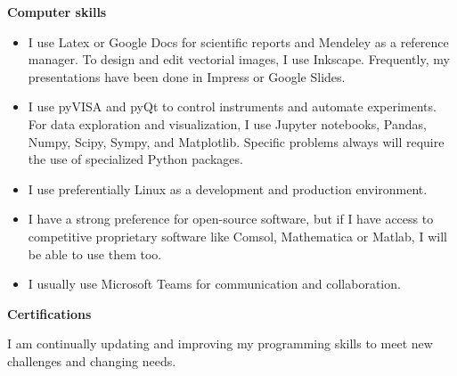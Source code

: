 \documentclass[letterpaper, 12pt]{article}[leftmargin=*]
\renewcommand{\section}[2]{
  \colorbox{secondary}{\color{white}\raggedbottom\normalsize\textbf{{#1}{\hspace{7pt}#2}}}
}
\newcommand{\resumeItemListStart}{\begin{itemize}[leftmargin=4.5mm]\itemsep-3pt}
\newcommand{\resumeItemListEnd}{\end{itemize}}
\newcommand{\resumeItem}[1]{
  \item\small{
    {#1}
  }
}
\begin{document}
\section{\faDesktop}{Computer skills}
\resumeItemListStart
\resumeItem{I use Latex or Google Docs for scientific reports and Mendeley as a reference manager. To design and edit vectorial images, I use Inkscape. Frequently, my presentations have been done in Impress or Google Slides.}
\resumeItem{I use pyVISA and pyQt to control instruments and automate experiments. For data exploration and visualization, I use Jupyter notebooks, Pandas, Numpy, Scipy, Sympy, and Matplotlib. Specific problems always will require the use of specialized Python packages.}
\resumeItem{I use preferentially Linux as a development and production environment.}
\resumeItem{I have a strong preference for open-source software, but if I have access to competitive proprietary software like Comsol, Mathematica or Matlab, I will be able to use them too.}
\resumeItem{I usually use Microsoft Teams for communication and collaboration.}
\resumeItemListEnd

\section{\faCertificate}{Certifications}

\vspace{0.2cm}
I am continually updating and improving my programming skills to meet new challenges and changing needs.
\vspace{-0.25cm}
\end{document}
